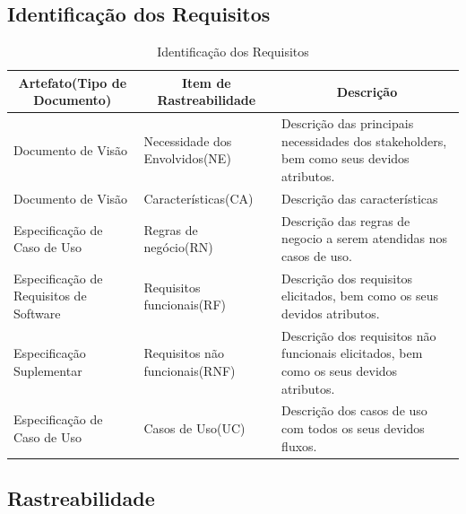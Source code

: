 \begin{apendicesenv}
\subsection{Identificação dos Requisitos}

\begin{table}[!h]
  \centering
  \caption{Identificação dos Requisitos}
  \label{identificação_dos_requisitos}
  \begin{tabular}{|p{4cm}|p{5cm}|p{6cm}|}
    \hline
    \multicolumn{1}{|c|}{\textbf{Artefato(Tipo de Documento)}} & \multicolumn{1}{c|}{\textbf{Item de Rastreabilidade}} & \multicolumn{1}{c|}{\textbf{Descrição}} \\ \hline
    Documento de Visão                      & Necessidade dos Envolvidos(NE)   & Descrição das principais necessidades dos stakeholders, bem como seus devidos atributos. \\ \hline
    Documento de Visão                      & Características(CA)              & Descrição das características                                                            \\ \hline
    Especificação de Caso de Uso            & Regras de negócio(RN)            & Descrição das regras de negocio a serem atendidas nos casos de uso.                      \\ \hline
    Especificação de Requisitos de Software & Requisitos funcionais(RF)        & Descrição dos requisitos elicitados, bem como os seus devidos atributos.                 \\ \hline
    Especificação Suplementar               & Requisitos não funcionais(RNF)   & Descrição dos requisitos não funcionais elicitados, bem como os seus devidos atributos.  \\ \hline
    Especificação de Caso de Uso            & Casos de Uso(UC)                 & Descrição dos casos de uso com todos os seus devidos fluxos.                                 \\ \hline
  \end{tabular}
\end{table}

\clearpage{}

\subsection {Rastreabilidade}


\end{apendicesenv}
